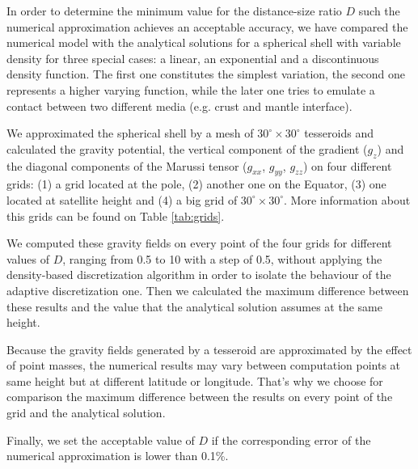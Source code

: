 \documentclass[extra]{gji}
\begin{document}
In order to determine the minimum value for the distance-size ratio $D$ such the numerical approximation achieves an acceptable accuracy, we have compared the numerical model with the analytical solutions for a spherical shell with variable density for three special cases: a linear, an exponential and a discontinuous density function.
The first one constitutes the simplest variation, the second one represents a higher varying function, while the later one tries to emulate a contact between two different media (e.g. crust and mantle interface).

We approximated the spherical shell by a mesh of $30^\circ \times 30^\circ$ tesseroids and calculated the gravity potential, the vertical component of the gradient ($g_z$) and the diagonal components of the Marussi tensor ($g_{xx}$, $g_{yy}$, $g_{zz}$) on four different grids: (1) a grid located at the pole, (2) another one on the Equator, (3) one located at satellite height and (4) a big grid of $30^\circ \times 30^\circ$.
More information about this grids can be found on Table \ref{tab:grids}.

We computed these gravity fields on every point of the four grids for different values of $D$, ranging from 0.5 to 10 with a step of 0.5, without applying the density-based discretization algorithm in order to isolate the behaviour of the adaptive discretization one.
Then we calculated the maximum difference between these results and the value that the analytical solution assumes at the same height.

Because the gravity fields generated by a tesseroid are approximated by the effect of point masses, the numerical results may vary between computation points at same height but at different latitude or longitude.
That's why we choose for comparison the maximum difference between the results on every point of the grid and the analytical solution.

Finally, we set the acceptable value of $D$ if the corresponding error of the numerical approximation is lower than 0.1\%.
\end{document}
